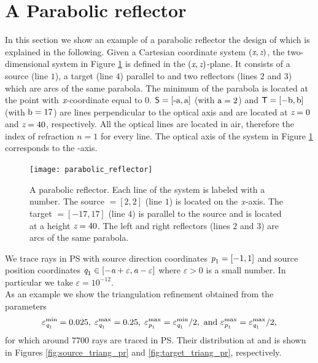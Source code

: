 \section{A Parabolic reflector}
In this section we show an example of a parabolic reflector the design of which is explained in the following. 
Given a Cartesian coordinate system  $(\textit{x},\textit{z})$, the two-dimensional system in Figure \ref{fig:PR} is defined in the $(\textit{x},\textit{z})$-plane.
 It consists of a source  (line $1$), a target  (line $4$) parallel to  and two reflectors (lines $2$ and $3$) which are arcs of the same parabola. 
  The minimum of the parabola is located at the point with $\textit{x}$-coordinate equal to $0$. $\textsf{S}=[\textrm{-a}, \textrm{a}]$ (with $\textrm{a}=2$) and $\textsf{T}=[-\textrm{b},\textrm{b}]$ (with $\textrm{b}=17$) are lines perpendicular to the optical axis and are located at $\textit{z}=0$ and $\textit{z}=40$, respectively.
All the optical lines are located in air, therefore the index of refraction ${n}=1$ for every line.
The optical axis of the system in Figure \ref{fig:PR} corresponds to the -axis.
\begin{figure}[h!]
\centering
\texttt{[image: parabolic\_reflector]}
\caption{\textrm{A parabolic reflector.}  Each line of the system is labeled with a number.
   The source $= [2,2]$ (line $1$) is located on the $\textit{x}$-axis.
   The target $= [-17, 17]$ (line $4$) is parallel to the source and is located at a height $ \textit{z}= 40$.
   The left and right reflectors (lines $2$ and $3$) are arcs of the same parabola.}
\label{fig:PR}
\end{figure}
We trace rays in PS with source direction coordinates $\textit{p}_1 = [-1,1]$ and source position coordinates $\textit{q}_1\in[-\textit{a}+\varepsilon,\textit{a}-\varepsilon]$ where $\varepsilon>0$ is a small number. In particular we take $\varepsilon = 10^{-12}$.\\ \indent As an example we show the triangulation refinement obtained from the parameters $$\varepsilon_{\textit{q}_1}^{\textrm{min}} = 0.025, \; \varepsilon_{\textit{q}_1}^{\textrm{max}} = 0.25, \; \varepsilon_{\textit{p}_1}^{\textrm{max}} = \varepsilon_{\textit{q}_1}^{\textrm{min}}/2, \mbox{ and }  \varepsilon_{\textit{p}_1}^{\textrm{max}} = \varepsilon_{\textit{q}_1}^{\textrm{max}}/2, $$ for which around $7700$ rays are traced in PS. Their distribution at  and  is shown in Figures \ref{fig:source_triang_pr} and \ref{fig:target_triang_pr}, respectively. 

